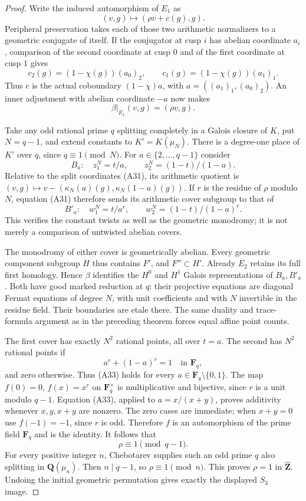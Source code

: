 \begin{proof}
Write the induced automorphism of $E_1$ as
\[
               (v,g)\longmapsto(\rho v+c(g),g).
\]
Peripheral preservation takes each of those two
arithmetic normalizers to a geometric conjugate of
itself. If the conjugator at cusp $i$ has abelian
coordinate $a_i$, comparison of the second coordinate
at cusp $0$ and of the first coordinate at cusp $1$
gives
\[
 c_2(g)=(1-\chi(g))(a_0)_2,
       \qquad c_1(g)=(1-\chi(g))(a_1)_1.
\]
Thus $c$ is the actual coboundary
$(1-\chi)a$, with $a=((a_1)_1,(a_0)_2)$.
An inner adjustment with abelian coordinate $-a$
now makes
\[
                   \beta|_{E_1}(v,g)=(\rho v,g).             \tag{A31}
\]

Take any odd rational prime $q$ splitting completely
in a Galois closure of $K$, put $N=q-1$, and extend
constants to $K'=K(\mu_N)$. There is a degree-one
place of $K'$ over $q$, since $q\equiv1\pmod N$.
For $a\in\{2,\ldots,q-1\}$ consider
\[
 B_a:\quad z_1^N=t/a,\qquad z_2^N=(1-t)/(1-a).
\]
Relative to the split coordinates (A31), its arithmetic
quotient is $(v,g)\mapsto v-(\kappa_N(a)(g),
\kappa_N(1-a)(g))$. If $r$ is the residue of $\rho$
modulo $N$, equation (A31) therefore sends its
arithmetic cover subgroup to that of
\[
 B'_a:\quad w_1^N=t/a^r,\qquad
                  w_2^N=(1-t)/(1-a)^r.                      \tag{A32}
\]
This verifies the constant twists as well as the
geometric monodromy; it is not merely a comparison
of untwisted abelian covers.

The monodromy of either cover is geometrically abelian.
Every geometric component subgroup $H$ thus contains
$F'$, and $F''\subset H'$. Already $E_2$ retains
its full first homology. Hence $\beta$ identifies the
$H^0$ and $H^1$ Galois representations of $B_a,B'_a$.
Both have good marked reduction at $q$: their
projective equations are diagonal Fermat equations
of degree $N$, with unit coefficients and with
$N$ invertible in the residue field. Their boundaries
are etale there. The same duality and trace-formula
argument as in the preceding theorem forces equal
affine point counts.

The first cover has exactly $N^2$ rational points,
all over $t=a$. The second has $N^2$ rational points
if
\[
                     a^r+(1-a)^r=1\quad\text{in }\mathbf F_q,
                                                               \tag{A33}
\]
and zero otherwise. Thus (A33) holds for every
$a\in\mathbf F_q\setminus\{0,1\}$.
The map $f(0)=0$, $f(x)=x^r$ on $\mathbf F_q^\times$
is multiplicative and bijective, since $r$ is a unit
modulo $q-1$. Equation (A33), applied to
$a=x/(x+y)$, proves additivity whenever
$x,y,x+y$ are nonzero. The zero cases are immediate;
when $x+y=0$ use $f(-1)=-1$, since $r$ is odd.
Therefore $f$ is an automorphism of the prime field
$\mathbf F_q$ and is the identity. It follows that
\[
                         \rho\equiv1\pmod{q-1}.
\]
For every positive integer $n$, Chebotarev supplies
such an odd prime $q$ also splitting in $\mathbf Q(\mu_n)$.
Then $n\mid q-1$, so $\rho\equiv1\pmod n$.
This proves $\rho=1$ in $\widehat{\mathbf Z}$.
Undoing the initial geometric permutation gives exactly
the displayed $S_3$ image.
\end{proof}

